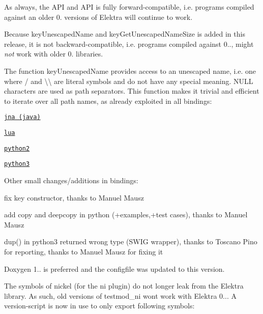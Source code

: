 As always, the A\+PI and A\+PI is fully forward-\/compatible, i.\+e. programs compiled against an older 0. versions of Elektra will continue to work.

Because {\ttfamily key\+Unescaped\+Name} and {\ttfamily key\+Get\+Unescaped\+Name\+Size} is added in this release, it is not backward-\/compatible, i.\+e. programs compiled against 0.., might {\itshape not} work with older 0. libraries.

The function {\ttfamily key\+Unescaped\+Name} provides access to an unescaped name, i.\+e. one where {\ttfamily /} and {\ttfamily \textbackslash{}\textbackslash{}} are literal symbols and do not have any special meaning. {\ttfamily N\+U\+LL} characters are used as path separators. This function makes it trivial and efficient to iterate over all path names, as already exploited in all bindings\+:


\begin{DoxyItemize}
\item \href{https://git.libelektra.org/blob/master/src/bindings/jna/HelloElektra.java}{\tt jna (java)}
\item \href{https://git.libelektra.org/blob/master/src/bindings/swig/lua/tests/test_key.lua}{\tt lua}
\item \href{https://git.libelektra.org/blob/master/src/bindings/swig/python2/tests/testpy2_key.py}{\tt python2}
\item \href{https://git.libelektra.org/blob/master/src/bindings/swig/python/tests/test_key.py}{\tt python3}
\end{DoxyItemize}

Other small changes/additions in bindings\+:


\begin{DoxyItemize}
\item fix key constructor, thanks to Manuel Mausz
\item add copy and deepcopy in python (+examples,+test cases), thanks to Manuel Mausz
\item dup() in python3 returned wrong type (S\+W\+IG wrapper), thanks to Toscano Pino for reporting, thanks to Manuel Mausz for fixing it
\end{DoxyItemize}

Doxygen 1.. is preferred and the configfile was updated to this version.

The symbols of nickel (for the ni plugin) do not longer leak from the Elektra library. As such, old versions of testmod\+\_\+ni won\textquotesingle{}t work with Elektra 0... A version-\/script is now in use to only export following symbols\+:


